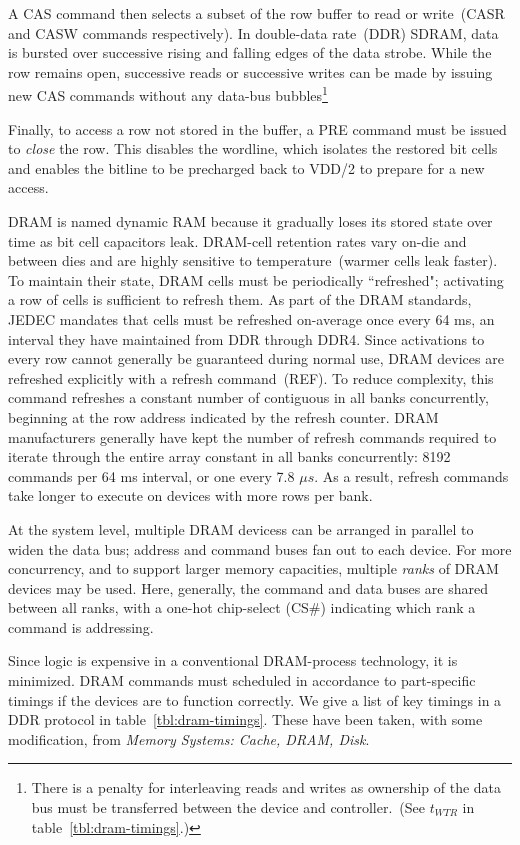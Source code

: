 A CAS command then selects a subset of the row buffer to read or write~(CASR
and CASW commands respectively). In double-data rate~(DDR) SDRAM, data is
bursted over successive rising and falling edges of the data strobe. While the
row remains open, successive reads or successive writes can be made by issuing
new CAS commands without any data-bus bubbles\footnote{There is a penalty for
interleaving reads and writes as ownership of the data bus must be transferred
between the device and controller.~(See $t_{WTR}$ in
table~\ref{tbl:dram-timings}.)}

Finally, to access a row not stored in the buffer, a PRE command must be issued
to \emph{close} the row. This disables the wordline, which isolates the
restored bit cells and enables the bitline to be precharged back to VDD/2 to
prepare for a new access.

DRAM is named dynamic RAM because it gradually loses its stored state over time
as bit cell capacitors leak. DRAM-cell retention rates vary on-die and between
dies and are highly sensitive to temperature~(warmer cells leak faster). To
maintain their state, DRAM cells must be periodically ``refreshed"; activating
a row of cells is sufficient to refresh them. As part of the DRAM standards,
JEDEC mandates that cells must be refreshed on-average once every 64 ms, an
interval they have maintained from DDR through DDR4. Since activations to every
row cannot generally be guaranteed during normal use, DRAM devices are
refreshed explicitly with a refresh command~(REF). To reduce complexity, this
command refreshes a constant number of contiguous in all banks concurrently, beginning at the row
address indicated by the refresh counter. DRAM
manufacturers generally have kept the number of refresh commands required to
iterate through the entire array constant in all banks concurrently: 8192 commands per 64 ms interval, or
one every 7.8 $\mu s$.  As a result, refresh commands take longer to execute on
devices with more rows per bank.

At the system level, multiple DRAM devicess can be arranged in parallel to widen the
data bus; address and command buses fan out to each device. For more concurrency,
and to support larger memory capacities, multiple \emph{ranks} of DRAM devices
may be used.  Here, generally, the command and data buses are shared between
all ranks, with a one-hot chip-select (CS\#) indicating which rank a command is
addressing.

Since logic is expensive in a conventional DRAM-process technology, it is
minimized. DRAM commands must scheduled in accordance to part-specific timings
if the devices are to function correctly. We give a list of key timings in a DDR
protocol in table~\ref{tbl:dram-timings}. These have been taken, with
some modification, from \textit{Memory Systems: Cache, DRAM,
Disk}\cite{drambook}.

